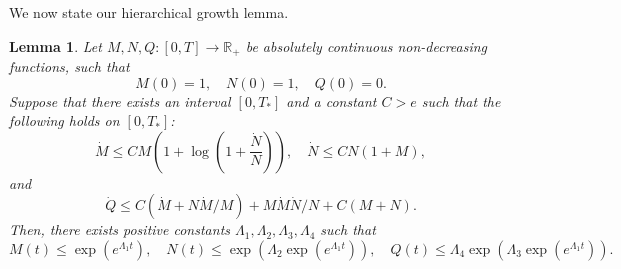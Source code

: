 \documentclass[12pt,letterpaper]{article}
\newtheorem{lem}[thm]{Lemma}
\theoremstyle{plain}
\begin{document}
We now state our hierarchical growth lemma. 
\begin{lem}\label{Hierarchical Growth of Norms for Bou and IIE}
  Let $M,N,Q: [0,T]\to \mathbb R_+$ be absolutely continuous non-decreasing functions, such that
  \begin{equation*}
  M(0)=1, \quad N(0)=1,\quad Q(0)=0.    
  \end{equation*}
  Suppose that there exists an interval $[0,T_*]$ and a constant $C>e$ such that the following holds on $[0,T_*]$:
  \begin{equation}\label{Differential inequality of MYZ}
   \dot M\le CM(1+\log(1+\frac{\dot N}{N})),\quad \dot N\le CN(1+M),  
  \end{equation}
  and
  \begin{equation}\label{Differential inequality of Duhamel Term}
    \dot Q\le C(\dot M+N\dot M/M)+M\dot M\dot N/N +C(M+N). 
  \end{equation}
  Then, there exists positive constants $\Lambda_1,\Lambda_2,\Lambda_3,\Lambda_4$ such that
  \begin{equation}\label{Growth of controlling norms}
  M(t)\le \exp(e^{\Lambda_1 t}),\quad N(t)\le \exp(\Lambda_2\exp(e^{\Lambda_1t})),\quad Q(t)\le \Lambda_4 \exp(\Lambda_3\exp( e^{\Lambda_1t})) .  
  \end{equation}
  
\end{lem}
\end{document}
